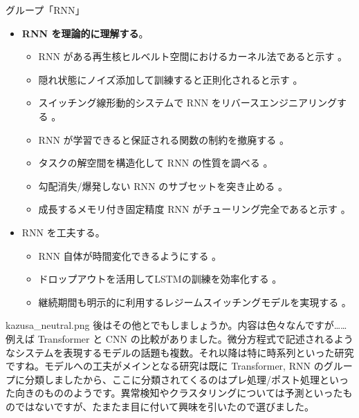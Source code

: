 \documentclass[b5paper,xelatex,ja=standard,10pt]{bxjsarticle}
\begin{document}
\vspace{1pt}
\begin{PROP}[left=0pt]{グループ「RNN」}
\begin{itemize}
  \item \textbf{RNN を理論的に理解する}。
  \begin{itemize}
    \item RNN がある再生核ヒルベルト空間におけるカーネル法であると示す \cite{AdelineFermanian2021}。
    \item 隠れ状態にノイズ添加して訓練すると正則化されると示す \cite{SoonHoeLim2021}。
    \item スイッチング線形動的システムで RNN をリバースエンジニアリングする \cite{JimmySmith2021}。
    \item RNN が学習できると保証される関数の制約を撤廃する \cite{LifuWang2021} \cite{AbhishekPanigrahi2021}。
    \item タスクの解空間を構造化して RNN の性質を調べる \cite{EliaTurner2021}。
    \item 勾配消失/爆発しない RNN のサブセットを突き止める \cite{ZimingZhang2021}。
    \item 成長するメモリ付き固定精度 RNN がチューリング完全であると示す \cite{StephenChung2021}。
  \end{itemize}
  \vspace{6pt}
  \item RNN を工夫する。
  \begin{itemize}
    \item RNN 自体が時間変化できるようにする \cite{AstonZhang2021}。
    \item ドロップアウトを活用してLSTMの訓練を効率化する \cite{AnupSarma2021}。
    \item 継続期間も明示的に利用するレジームスイッチングモデルを実現する \cite{AbdulFatirAnsari2021}。
  \end{itemize}
\end{itemize}
\end{PROP}
\vspace{1pt}

\begin{SERIFU}[colback=PaleIris, colbacktitle=PaleIris2]{kazusa_neutral.png}
後はその他とでもしましょうか。内容は色々なんですが……例えば Transformer と CNN の比較がありました。微分方程式で記述されるようなシステムを表現するモデルの話題も複数。それ以降は特に時系列といった研究ですね。モデルへの工夫がメインとなる研究は既に Transformer, RNN のグループに分類しましたから、ここに分類されてくるのはプレ処理/ポスト処理といった向きのもののようです。異常検知やクラスタリングについては予測といったものではないですが、たまたま目に付いて興味を引いたので選びました。
\end{SERIFU}
\end{document}
